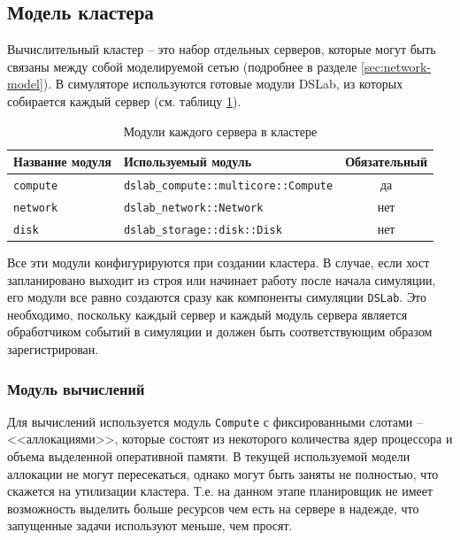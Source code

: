 \subsection{Модель кластера}\label{cluster-model}
Вычислительный кластер -- это набор отдельных серверов, которые могут быть связаны между собой моделируемой сетью (подробнее в разделе \ref{sec:network-model}). 
В симуляторе используются готовые модули DSLab, из которых собирается каждый сервер (см. таблицу \ref{tab:server_modules}). 
\begin{table}[h]
    \centering
    \begin{tabular}{|l|l|c|}
    \hline
    \textbf{Название модуля} & \textbf{Используемый модуль} & \textbf{Обязательный} \\
    \hline
    \texttt{compute} & \texttt{dslab\_compute::multicore::Compute} & да \\
    \hline
    \texttt{network} & \texttt{dslab\_network::Network} & нет  \\
    \hline
    \texttt{disk} & \texttt{dslab\_storage::disk::Disk} & нет \\
    \hline
    \end{tabular}
    \caption{Модули каждого сервера в кластере}
    \label{tab:server_modules}
\end{table}

Все эти модули конфигурируются при создании кластера. В случае, если хост запланировано выходит из строя или начинает работу после начала симуляции, его модули все равно создаются сразу как компоненты симуляции \texttt{DSLab}. Это необходимо, поскольку каждый сервер и каждый модуль сервера является обработчиком событий в симуляции и должен быть соответствующим образом зарегистрирован.

\subsubsection{Модуль вычислений}

Для вычислений используется модуль \texttt{Compute} с фиксированными слотами -- <<аллокациями>>, которые состоят из некоторого количества ядер процессора и объема выделенной оперативной памяти. В текущей используемой модели аллокации не могут пересекаться, однако могут быть заняты не полностью, что скажется на утилизации кластера. Т.е. на данном этапе планировщик не имеет возможность выделить больше ресурсов чем есть на сервере в надежде, что запущенные задачи используют меньше, чем просят. 

